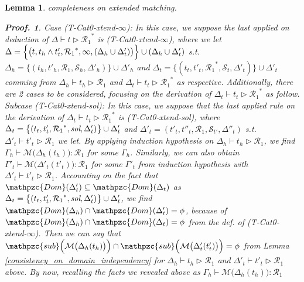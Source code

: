 \documentclass[12pt]{article}
\newtheorem{Lemma}{Lemma}[section]
\newtheorem{Proof}{Proof.}
\begin{document}
\begin{Lemma}{completeness on extended matching.}
\begin{Proof}
    Case (T-Cat0-xtend-$\infty$): In this case, we suppose the last applied
    on deduction of $\Delta \vdash t \triangleright {\mathcal{R}_1}^*$ is
    (T-Cat0-xtend-$\infty$), where we let
    $\Delta = \Bigl\{\bigl(t, t_h \wedge t'_t, {\mathcal{R}_1}^*, \infty,
    (\Delta_h \cup \Delta'_t) \bigr) \Bigr\} \cup (\Delta_h \cup \Delta'_t)$
    s.t. $\Delta_h = \bigl\{(t_h, t'_h, \mathcal{R}_1, \mathcal{S}_h,
    \Delta'_h)\bigr\} \cup \Delta'_h$ and
    $\Delta_t = \bigl\{(t_t, t'_t, {\mathcal{R}_1}^*, \mathcal{S}_t,
    \Delta'_t) \bigr\} \cup \Delta'_t$ comming from
    $\Delta_h \vdash t_h \triangleright \mathcal{R}_1$ and
    $\Delta_t \vdash t_t \triangleright {\mathcal{R}_1}^*$ as respective.
    Additionally, there are 2 cases to be considered, focusing on
    the derivation of $\Delta_t \vdash t_t \triangleright {\mathcal{R}_1}^*$
    as follow.
    Subcase (T-Cat0-xtend-sol): In this case, we suppose that
    the last applied rule on the derivation of
    $\Delta_t \vdash t_t \triangleright {\mathcal{R}_1}^*$ is
    (T-Cat0-xtend-sol), where
    $\Delta_t = \bigl\{(t_t, t'_t, {\mathcal{R}_1}^*, \text{\it sol},
    \Delta'_t) \bigr\} \cup \Delta'_t$ and
    $\Delta'_t = (t'_t, t''_t, \mathcal{R}_1, \mathcal{S}_{t'},
    \Delta''_t)$ s.t. $\Delta'_t \vdash t'_t \triangleright \mathcal{R}_1$
    we let. By applying induction hypothesis on
    $\Delta_h \vdash t_h \triangleright \mathcal{R}_1$, we find
    $\Gamma_h \vdash \mathcal{M}\bigl(\Delta_h(t_h) \bigr) : \mathcal{R}_1$
    for some $\Gamma_h$. Similarly, we can also obtain
    $\Gamma'_t \vdash \mathcal{M}\bigl(\Delta'_t(t'_t) \bigr) :
    \mathcal{R}_1$ for some $\Gamma'_t$ from induction hypothesis with
    $\Delta'_t \vdash t'_t \triangleright \mathcal{R}_1$.
    Accounting on the fact that
    $\mathpzc{Dom}(\Delta'_t) \subseteq \mathpzc{Dom}(\Delta_t)$ as
    $\Delta_t = \bigl\{(t_t, t'_t, {\mathcal{R}_1}^*, \text{\it sol},
    \Delta'_t) \bigr\} \cup \Delta'_t$, we find
    $\mathpzc{Dom}(\Delta_h) \cap \mathpzc{Dom}(\Delta'_t) = \phi$, because
    of $\mathpzc{Dom}(\Delta_h) \cap \mathpzc{Dom}(\Delta_t) = \phi$ from
    the def. of (T-Cat0-xtend-$\infty$). Then we can say that
    $\mathpzc{sub}\Bigl(\mathcal{M}\bigl(\Delta_h(t_h) \bigr) \Bigr) \cap
    \mathpzc{sub}\Bigl(\mathcal{M}\bigl(\Delta'_t(t'_t) \bigr) \Bigr) =
    \phi$ from Lemma \ref{consistency_on_domain_independency} for
    $\Delta_h \vdash t_h \triangleright \mathcal{R}_1$ and
    $\Delta'_t \vdash t'_t \triangleright \mathcal{R}_1$ above. By now,
    recalling the facts we revealed above as
    $\Gamma_h \vdash \mathcal{M}\bigl(\Delta_h(t_h) \bigr) : \mathcal{R}_1$

\end{Proof}
\end{Lemma}
\end{document}
